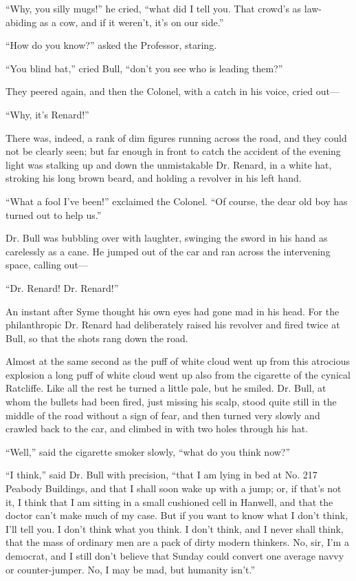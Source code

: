 \documentclass{book}
\begin{document}
“Why, you silly mugs!” he cried, “what did I tell you. That crowd’s as law-abiding as a cow, and if it weren’t, it’s on our side.”

“How do you know?” asked the Professor, staring.

“You blind bat,” cried Bull, “don’t you see who is leading them?”

They peered again, and then the Colonel, with a catch in his voice, cried out—

“Why, it’s Renard!”

There was, indeed, a rank of dim figures running across the road, and they could not be clearly seen; but far enough in front to catch the accident of the evening light was stalking up and down the unmistakable Dr. Renard, in a white hat, stroking his long brown beard, and holding a revolver in his left hand.

“What a fool I’ve been!” exclaimed the Colonel. “Of course, the dear old boy has turned out to help us.”

Dr. Bull was bubbling over with laughter, swinging the sword in his hand as carelessly as a cane. He jumped out of the car and ran across the intervening space, calling out—

“Dr. Renard! Dr. Renard!”

An instant after Syme thought his own eyes had gone mad in his head. For the philanthropic Dr. Renard had deliberately raised his revolver and fired twice at Bull, so that the shots rang down the road.

Almost at the same second as the puff of white cloud went up from this atrocious explosion a long puff of white cloud went up also from the cigarette of the cynical Ratcliffe. Like all the rest he turned a little pale, but he smiled. Dr. Bull, at whom the bullets had been fired, just missing his scalp, stood quite still in the middle of the road without a sign of fear, and then turned very slowly and crawled back to the car, and climbed in with two holes through his hat.

“Well,” said the cigarette smoker slowly, “what do you think now?”

“I think,” said Dr. Bull with precision, “that I am lying in bed at No. 217 Peabody Buildings, and that I shall soon wake up with a jump; or, if that’s not it, I think that I am sitting in a small cushioned cell in Hanwell, and that the doctor can’t make much of my case. But if you want to know what I don’t think, I’ll tell you. I don’t think what you think. I don’t think, and I never shall think, that the mass of ordinary men are a pack of dirty modern thinkers. No, sir, I’m a democrat, and I still don’t believe that Sunday could convert one average navvy or counter-jumper. No, I may be mad, but humanity isn’t.”
\end{document}
